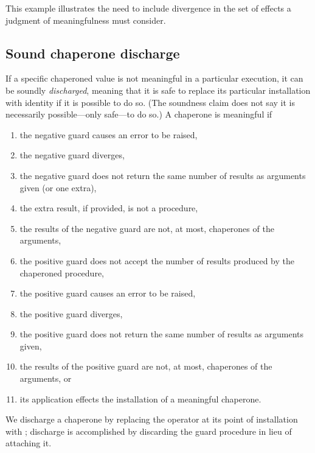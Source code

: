 This example illustrates the need to include divergence in the set of effects a judgment of meaningfulness must consider.

\subsection{Sound chaperone discharge}

If a specific chaperoned value is not meaningful in a particular execution, it can be soundly \emph{discharged}, meaning that it is safe to replace its particular installation with identity if it is possible to do so.
(The soundness claim does not say it is necessarily possible---only safe---to do so.)
A chaperone is meaningful if
\begin{enumerate}
\item the negative guard causes an error to be raised,
\item \label{con:neg-divergence} the negative guard diverges,
\item the negative guard does not return the same number of results as arguments given (or one extra),
\item the extra result, if provided, is not a procedure,
\item the results of the negative guard are not, at most, chaperones of the arguments,
\item the positive guard does not accept the number of results produced by the chaperoned procedure,
\item the positive guard causes an error to be raised,
\item the positive guard diverges,
\item the positive guard does not return the same number of results as arguments given,
\item the results of the positive guard are not, at most, chaperones of the arguments, or
\item its application effects the installation of a meaningful chaperone.
\end{enumerate}







We discharge a chaperone by replacing the operator at its point of installation with ; discharge is accomplished by discarding the guard procedure in lieu of attaching it.


